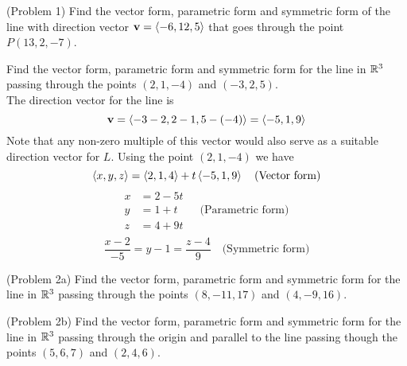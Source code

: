 \documentclass[handout]{ximera}
\begin{document}
\begin{problem}(Problem 1)
Find the vector form, parametric form and symmetric form of the line with direction 
vector $\mathbf{v} = \left\langle -6, 12, 5\right\rangle$ that goes through the point $P(13, 2, -7)$. \\
\end{problem}

\begin{example}[Example 2]
Find the vector form, parametric form and symmetric form for the line in $\mathbb R^3$ passing 
through the points $(2, 1, -4)$ and $(-3, 2, 5)$.\\
The direction vector for the line is 
\[
\mathbf{v} = \left\langle -3-2, 2-1, 5-(-4)\right\rangle = \left\langle -5, 1, 9\right\rangle
\]
Note that any non-zero multiple of this vector would also serve as a suitable direction vector for $L$. 
Using the point $(2, 1, -4)$ we have
\[
\left\langle x, y, z\right\rangle = \left\langle 2, 1, 4\right\rangle + t\left\langle -5, 1, 9\right\rangle \quad \text{(Vector form)}
\]
\begin{align*}
x &= 2 -5t\\
y &= 1 + t \quad\quad\text{(Parametric form)}\\
z &= 4 + 9t\\
\end{align*}
\[
\frac{x-2}{-5} = y-1 = \frac{z-4}{9} \quad \text{(Symmetric form)}
\]
\end{example}

\begin{problem}(Problem 2a)
Find the vector form, parametric form and symmetric form for the line in $\mathbb R^3$ passing 
through the points $(8, -11, 17)$ and $(4, -9, 16)$.\\
\end{problem}

\begin{problem}(Problem 2b)
Find the vector form, parametric form and symmetric form for the line in $\mathbb R^3$ passing through the origin 
and parallel to the line passing though the points $(5, 6, 7)$ and $(2, 4, 6)$.\\
\end{problem}
\end{document}
